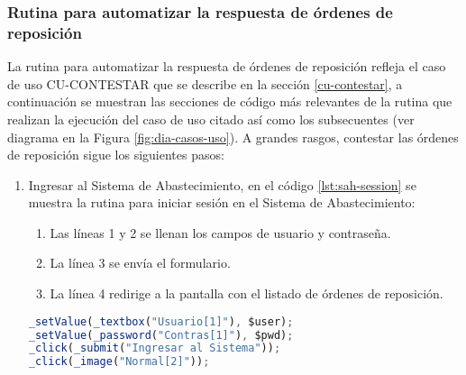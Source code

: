 \subsubsection{Rutina para automatizar la respuesta de órdenes de reposición}\label{sec-aut-contestar}
La rutina para automatizar la respuesta de órdenes de reposición refleja el caso de uso  CU-CONTESTAR que se describe en la sección \ref{cu-contestar}, a continuación se muestran las secciones de código más relevantes de la rutina que realizan la ejecución del caso de uso citado así como los subsecuentes (ver diagrama en la Figura \ref{fig:dia-casos-uso}). A grandes rasgos, contestar las órdenes de reposición sigue los siguientes pasos:
\begin{enumerate}
	\item Ingresar al Sistema de Abastecimiento, en el código \ref{lst:sah-session} se muestra la rutina para iniciar sesión en el Sistema de Abastecimiento:
	\begin{enumerate}
		\item Las líneas 1 y 2 se llenan los campos de usuario y contraseña.
		\item La línea 3 se envía el formulario.
		\item La línea 4 redirige a la pantalla con el listado de órdenes de reposición.  
	\end{enumerate}
	\begin{lstlisting}[language=Javascript, caption={Inicio de sesión en el Sistema de Abastecimiento.}, label={lst:sah-session}]
_setValue(_textbox("Usuario[1]"), $user);
_setValue(_password("Contras[1]"), $pwd);
_click(_submit("Ingresar al Sistema"));
_click(_image("Normal[2]"));
	\end{lstlisting}


\end{enumerate}
